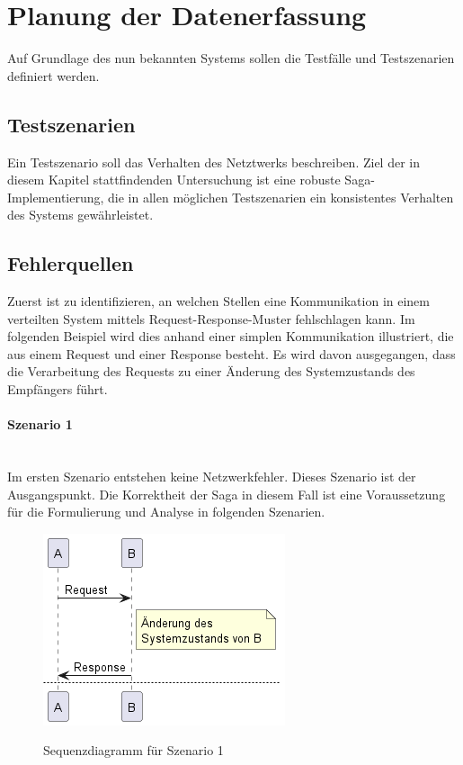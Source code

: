 \section{Planung der Datenerfassung}
Auf Grundlage des nun bekannten Systems sollen die Testfälle und Testszenarien definiert werden.

\subsection{Testszenarien}
Ein Testszenario soll das Verhalten des Netztwerks beschreiben. Ziel der in diesem Kapitel stattfindenden Untersuchung ist eine robuste Saga-Implementierung, die in allen möglichen Testszenarien ein konsistentes Verhalten des Systems gewährleistet. 

\subsection{Fehlerquellen}
Zuerst ist zu identifizieren, an welchen Stellen eine Kommunikation in einem verteilten System mittels Request-Response-Muster fehlschlagen kann. Im folgenden Beispiel wird dies anhand einer simplen Kommunikation illustriert, die aus einem Request und einer Response besteht. Es wird davon ausgegangen, dass die Verarbeitung des Requests zu einer Änderung des Systemzustands des Empfängers führt. 

\paragraph*{Szenario 1} \mbox{}\\
Im ersten Szenario entstehen keine Netzwerkfehler. Dieses Szenario ist der Ausgangspunkt. Die Korrektheit der Saga in diesem Fall ist eine Voraussetzung für die Formulierung und Analyse in folgenden Szenarien. 

\begin{figure}[H]
	\centering
	\includegraphics[width=.4\linewidth]{figures/ChapterVersuchsvorbereitung/TestSzenarien-0.png}
	\label{fig:Testszenario1}
	\caption{Sequenzdiagramm für Szenario 1}
\end{figure}
\FloatBarrier

